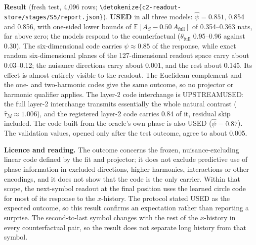 \documentclass[11pt,a4paper]{article}
\newcommand{\E}{\mathbb{E}}
\DeclareRobustCommand{\_}{\ifmmode\origunderscore\else\textunderscore\allowbreak\fi}
\DeclareRobustCommand{\fpath}[1]{\begingroup\small\expandafter\nolinkurl\expandafter{\detokenize{#1}}\endgroup}
\begin{document}
\textbf{Result} (fresh test, 4,096 rows; \fpath{c2-readout-store/stages/S5/report.json}).
\textbf{USED} in all three models: $\hat\psi=0.851$, 0.854 and 0.856, with one-sided lower
bounds of $\E[A_S-0.50\,A_{\mathrm{full}}]$ of 0.354--0.363 nats, far above zero; the models
respond to the counterfactual ($\theta_{\mathrm{full}}$ 0.95--0.96 against 0.30). The six-dimensional
code carries $\psi\approx0.85$ of the response, while exact random six-dimensional planes of the
127-dimensional readout space carry about 0.03--0.12; the nuisance directions carry about 0.001,
and the rest about 0.145. Its effect is almost entirely visible to the readout. The Euclidean
complement and the one- and two-harmonic codes give the same outcome, so no projector or
harmonic qualifier applies. The layer-2 code interchange is UPSTREAM\_USED: the full layer-2
interchange transmits essentially the whole natural contrast ($\hat\tau_M\approx1.006$), and the
registered layer-2 code carries 0.84 of it, residual skip included. The code built from the
oracle's own phase is also USED ($\hat\psi=0.87$). The validation values, opened only after the
test outcome, agree to about 0.005.

\textbf{Licence and reading.} The outcome concerns the frozen, nuisance-excluding linear code
defined by the fit and projector; it does not exclude predictive use of phase information in
excluded directions, higher harmonics, interactions or other encodings, and it does not show
that the code is the only carrier. Within that scope, the next-symbol readout at the final
position uses the learned circle code for most of its response to the $x$-history. The protocol
stated USED as the expected outcome, so this result confirms an expectation rather than
reporting a surprise. The second-to-last symbol changes with the rest of the $x$-history in
every counterfactual pair, so the result does not separate long history from that symbol.
\end{document}
